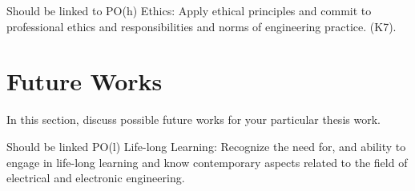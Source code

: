 Should be linked to PO(h) Ethics: Apply ethical principles and commit to professional ethics and responsibilities and norms of engineering practice. (K7).

\section{Future Works}

In this section, discuss possible future works for your particular thesis work. 

Should be linked PO(l) Life-long Learning: Recognize the need for, and ability to engage in life-long learning and know contemporary aspects related to the field of electrical and electronic engineering.
\endinput

